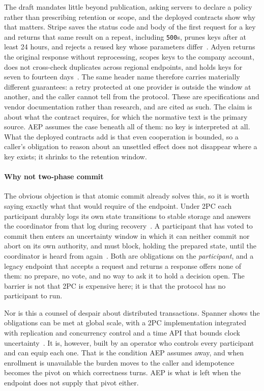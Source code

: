 The draft mandates little beyond publication, asking servers to
declare a policy rather than prescribing retention or scope, and the deployed
contracts show why that matters. Stripe saves the status code and body of the
first request for a key and returns that same result on a repeat, including
\texttt{500}s, prunes keys after at least 24 hours, and rejects a reused key
whose parameters differ~\cite{stripe-idempotency}. Adyen returns the original
response without reprocessing, scopes keys to the company account, does not
cross-check duplicates across regional endpoints, and holds keys for seven to
fourteen days~\cite{adyen-idempotency}. The same header name therefore carries
materially different guarantees: a retry protected at one provider is outside the
window at another, and the caller cannot tell from the protocol. These are
specifications and vendor documentation rather than research, and are cited as
such. The claim is about what the contract requires, for which the normative
text is the primary source. AEP assumes the case beneath all of them: no key is
interpreted at all. What the deployed contracts add is that even cooperation is
bounded, so a caller's obligation to reason about an unsettled effect does not
disappear where a key exists; it shrinks to the retention window.

\paragraph{Why not two-phase commit} The obvious objection is that atomic commit
already solves this, so it is worth saying exactly what that would require of the
endpoint. Under 2PC each participant durably logs its own state transitions to
stable storage and answers the coordinator from that log during
recovery~\cite{mohan1986rstar}. A participant that has voted to commit then
enters an uncertainty window in which it can neither commit nor abort on its own
authority, and must block, holding the prepared state, until the
coordinator is heard from again~\cite{skeen1981nonblocking}. Both are obligations
on the \emph{participant}, and a legacy endpoint that accepts a request and
returns a response offers none of them: no prepare, no vote, and no way to ask it
to hold a decision open. The barrier is not that 2PC is expensive here; it is
that the protocol has no participant to run.

Nor is this a counsel of despair about distributed transactions. Spanner shows
the obligations can be met at global scale, with a 2PC implementation integrated
with replication and concurrency control and a time API that bounds clock
uncertainty~\cite{corbett2012spanner}. It is, however, built by an operator
who controls every participant and can equip each one. That is the condition AEP
assumes away, and when enrollment is unavailable the burden moves to the caller
and idempotence becomes the pivot on which correctness turns. AEP is what is left
when the endpoint does not supply that pivot either.

